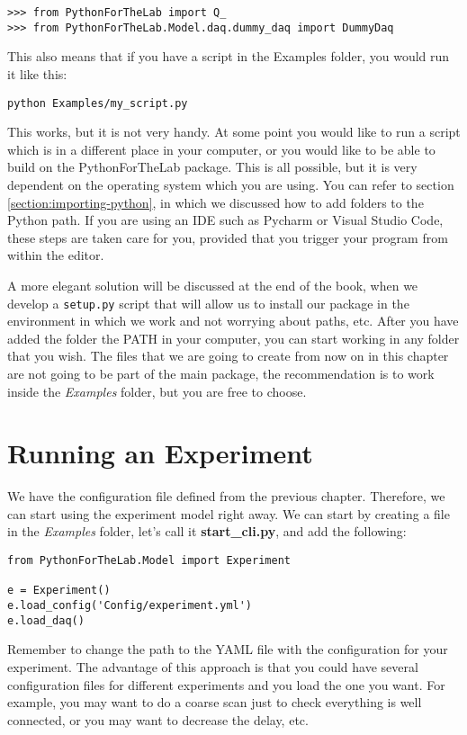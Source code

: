 \begin{verbatim}
>>> from PythonForTheLab import Q_
>>> from PythonForTheLab.Model.daq.dummy_daq import DummyDaq
\end{verbatim}

This also means that if you have a script in the Examples folder, you would run it like this:

\begin{verbatim}
python Examples/my_script.py
\end{verbatim}

This works, but it is not very handy. At some point you would like to run a script which is in a different place in your computer, or you would like to be able to build on the PythonForTheLab package. This is all possible, but it is very dependent on the operating system which you are using. You can refer to section \ref{section:importing-python}, in which we discussed how to add folders to the Python path. If you are using an IDE such as Pycharm or Visual Studio Code, these steps are taken care for you, provided that you trigger your program from within the editor. 

A more elegant solution will be discussed at the end of the book, when we develop a \texttt{setup.py} script that will allow us to install our package in the environment in which we work and not worrying about paths, etc. After you have added the folder the {PATH} in your computer, you can start working in any folder that you wish. The files that we are going to create from now on in this chapter are not going to be part of the main package, the recommendation is to work inside the \emph{Examples} folder, but you are free to choose. 

\section{Running an Experiment}\label{running-anexperiment}
We have the configuration file defined from the previous chapter. Therefore, we can start using the experiment model right away. We can start by creating a file in the \emph{Examples} folder, let's call it \textbf{start\_cli.py}, and add the following:

\begin{verbatim}
from PythonForTheLab.Model import Experiment

e = Experiment()
e.load_config('Config/experiment.yml')
e.load_daq()
\end{verbatim}

Remember to change the path to the {YAML} file with the configuration for your experiment. The advantage of this approach is that you could have several configuration files for different experiments and you load the one you want. For example, you may want to do a coarse scan just to check everything is well connected, or you may want to decrease the delay, etc. 

